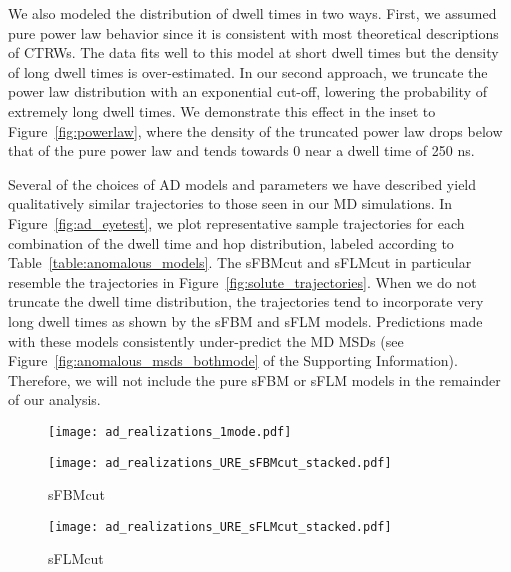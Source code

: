 \documentclass[journal=ancac3,manuscript=article,layout=twocolumn]{achemso}
\begin{document}
  We also modeled the distribution of dwell times in two ways. First, we
  assumed pure power law behavior since it is consistent with most theoretical
  descriptions of CTRWs. The data fits well to this model at short dwell times
  but the density of long dwell times is over-estimated. In our second
  approach, we truncate the power law distribution with an exponential cut-off,
  lowering the probability of extremely long dwell times. We demonstrate this
  effect in the inset to Figure~\ref{fig:powerlaw}, where the density of the
  truncated power law drops below that of the pure power law and tends towards
  0 near a dwell time of 250 ns.
  
  Several of the choices of AD models and parameters we have described yield
  qualitatively similar trajectories to those seen in our MD simulations.  In
  Figure~\ref{fig:ad_eyetest}, we plot representative sample trajectories for
  each combination of the dwell time and hop distribution, labeled according to
  Table~\ref{table:anomalous_models}. The sFBMcut and sFLMcut in particular
  resemble the trajectories in Figure~\ref{fig:solute_trajectories}.  When we
  do not truncate the dwell time distribution, the trajectories tend to
  incorporate very long dwell times as shown by the sFBM and sFLM models.
  Predictions made with these models consistently under-predict the MD MSDs
  (see Figure~\ref{fig:anomalous_msds_bothmode} of the Supporting Information).
  Therefore, we will not include the pure sFBM or sFLM models in the
  remainder of our analysis.   
  
  \begin{figure*}
  \centering
  \begin{subfigure}{0.325\textwidth}
  \texttt{[image: ad\_realizations\_1mode.pdf]}
  \caption{}\label{fig:ad_realizations_1mode}
  \end{subfigure}
  \begin{subfigure}{0.325\textwidth}
  \texttt{[image: ad\_realizations\_URE\_sFBMcut\_stacked.pdf]}
  \caption{sFBMcut}\label{fig:ad_realizations_sFBMcut_stacked}
  \end{subfigure}
  \begin{subfigure}{0.325\textwidth}
  \texttt{[image: ad\_realizations\_URE\_sFLMcut\_stacked.pdf]}
  \caption{sFLMcut}\label{fig:ad_realizations_sFLMcut_stacked}
  \end{subfigure}
  \caption{(a) Simulated urea trajectories generated by each of the four
	  variations of the one mode AD model display qualitatively similar
	  hopping and trapping behavior to that shown in
	  Figure~\ref{fig:solute_trajectories}. Dwell times are exaggerated in
	  the sFBM and sFLM models because the power law dwell time
	  distributions are not truncated and have infinite variance. In (b)
	  and (c) we compare additional trajectories simulated with the sFBMcut
	  and sFLMcut models (blue) to MD solute trajectories (black).
	  Trajectories are vertically offset for visual clarity.
  }\label{fig:ad_eyetest}
  \end{figure*}
    
\end{document}
